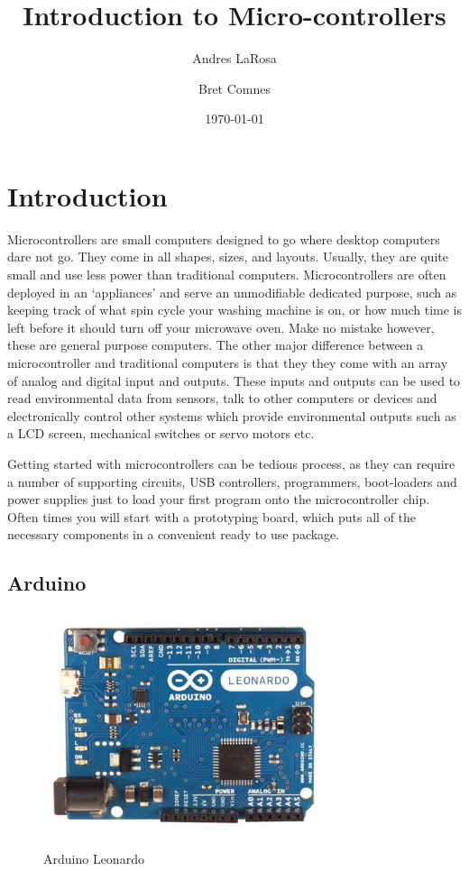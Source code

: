 \documentclass[11pt,a4paper]{article}
\begin{document}
\title{Introduction to Micro-controllers}
\date{\today} 
\author{Andres LaRosa}
\author{Bret Comnes}
\maketitle

\section{Introduction} %
\label{sec:introduction}

Microcontrollers are small computers designed to go where desktop computers dare not go.  They come in all shapes, sizes, and layouts.  Usually, they are quite small and use less power than traditional computers.  Microcontrollers are often deployed in an `appliances' and serve an unmodifiable dedicated purpose, such as keeping track of what spin cycle your washing machine is on, or how much time is left before it should turn off your microwave oven.  Make no mistake however, these are general purpose computers.  The other major difference between a microcontroller and traditional computers is that they they come with an array of analog and digital input and outputs. These inputs and outputs can be used to read environmental data from sensors, talk to other computers or devices and electronically control other systems which provide environmental outputs such as a LCD screen, mechanical switches or servo motors etc.  \cite{wpmicro}

Getting started with microcontrollers can be tedious process, as they can require a number of supporting circuits, USB controllers, programmers, boot-loaders and power supplies just to load your first program onto the microcontroller chip.  Often times you will start with a prototyping board, which puts all of the necessary components in a convenient ready to use package.

\subsection{Arduino} %
\label{sub:arduino}

\begin{figure}[htbp]
	\centering
		\includegraphics[height=2.7in]{figures/ArduinoLeonardoFront_2_450px.jpg}
	\caption{Arduino Leonardo\cite{leonardo}}
	\label{fig:figures_ArduinoLeonardoFront_2_450px}
\end{figure}
\end{document}
